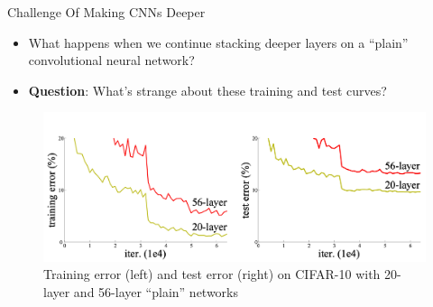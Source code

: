 \documentclass[serif, aspectratio=169]{beamer}
\begin{document}
\begin{frame}{Challenge Of Making CNNs Deeper}
	\begin{itemize}
		\item What happens when we continue stacking deeper layers on a ``plain'' convolutional neural network?
		\item \textbf{Question}: What’s strange about these training and test curves?
	\end{itemize}
	\begin{figure}[htpb]
		\begin{center}
			\includegraphics[keepaspectratio, scale=0.17]{pic/plain}
			\captionsetup{justification=centering}
			\caption*{\scriptsize{Training error (left) and test error (right) on CIFAR-10 with 20-layer and 56-layer “plain” networks}}
		\end{center}
	\end{figure}
\end{frame}
\end{document}
